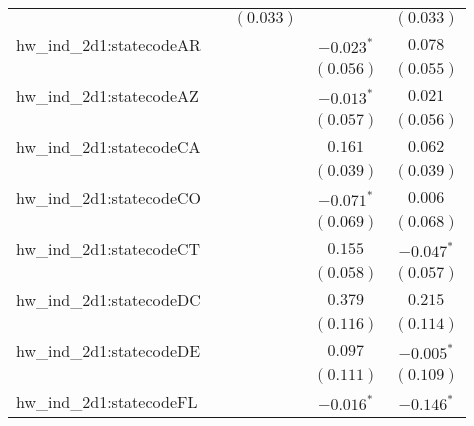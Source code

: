 \begin{center}
\begin{longtable}{l c c c c}
                         &                       & $(0.033)$             &                       & $(0.033)$             \\
hw\_ind\_2d1:statecodeAR &                       &                       & $\mathbf{-0.023}^{*}$ & $0.078$               \\
                         &                       &                       & $(0.056)$             & $(0.055)$             \\
hw\_ind\_2d1:statecodeAZ &                       &                       & $\mathbf{-0.013}^{*}$ & $0.021$               \\
                         &                       &                       & $(0.057)$             & $(0.056)$             \\
hw\_ind\_2d1:statecodeCA &                       &                       & $0.161$               & $0.062$               \\
                         &                       &                       & $(0.039)$             & $(0.039)$             \\
hw\_ind\_2d1:statecodeCO &                       &                       & $\mathbf{-0.071}^{*}$ & $0.006$               \\
                         &                       &                       & $(0.069)$             & $(0.068)$             \\
hw\_ind\_2d1:statecodeCT &                       &                       & $0.155$               & $\mathbf{-0.047}^{*}$ \\
                         &                       &                       & $(0.058)$             & $(0.057)$             \\
hw\_ind\_2d1:statecodeDC &                       &                       & $0.379$               & $0.215$               \\
                         &                       &                       & $(0.116)$             & $(0.114)$             \\
hw\_ind\_2d1:statecodeDE &                       &                       & $0.097$               & $\mathbf{-0.005}^{*}$ \\
                         &                       &                       & $(0.111)$             & $(0.109)$             \\
hw\_ind\_2d1:statecodeFL &                       &                       & $\mathbf{-0.016}^{*}$ & $\mathbf{-0.146}^{*}$ \\

\end{longtable}
\end{center}
